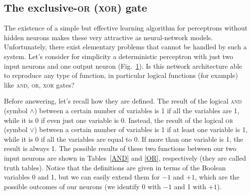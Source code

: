 \subsection{The exclusive-\texorpdfstring{\textsc{or}}{ᴏʀ} (\texorpdfstring{\textsc{xor}}{xᴏʀ}) gate}\label{sec:Theexclusivexor}
The existence of a simple but effective learning algorithm for perceptrons without hidden neurons makes these very attractive as neural-network models. Unfortunately, there exist elementary problems that cannot be handled by such a system. Let's consider for simplicity a deterministic perceptron with just two input neurons and one output neuron (Fig.~\ref{PerceptronXOR}). Is this network architecture able to reproduce any type of function, in particular logical functions (for example) like \textsc{and}, \textsc{or}, \textsc{xor} gates?
\begin{figure}[h!t]
\centering
{}
\caption{}\label{PerceptronXOR}
\end{figure}

Before answering, let's recall how they are defined. The result of the logical \textsc{and} (symbol $\land$) between a certain number of variables is 1 if all the variables are 1, while it is 0 if even just one variable is 0. Instead, the result of the logical \textsc{or} (symbol $\lor$) between a certain number of variables is 1 if at least one variable is 1, while it is 0 if all the variables are equal to 0. If more than one variable is 1, the result is always 1. The possible results of these two functions between our two input neurons are shown in Tables~\ref{AND} and \ref{OR}, respectively (they are called truth tables). Notice that the definitions are given in terms of the Boolean variables 0 and 1, but we can easily extend them for $-1$ and $+1$, which are the possible outcomes of our neurons (we identify 0 with $-1$ and 1 with $+1$).

